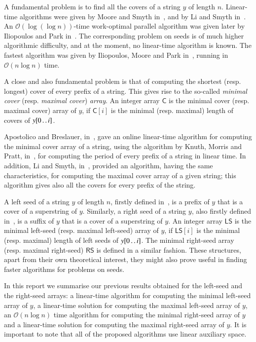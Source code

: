 \documentclass[preprint,12pt]{elsarticle}
\newcommand{\dd}{\mathinner{\ldotp\ldotp}}
\newcommand{\carr}{\textsf{C}}      %
\newcommand{\sarr}{\textsf{LS}}      %
\newcommand{\rsarr}{\textsf{RS}}      %
\newcommand{\cO}{\ensuremath{\mathcal{O}}}
\begin{document}
A fundamental problem is to find all the covers of a string $y$ of length $n$. 
Linear-time algorithms were given by Moore and Smyth in~\cite{moore1994optimal}, 
and by Li and Smyth in~\cite{cover_bill}. An $\cO(\log(\log n))$-time work-optimal parallel 
algorithm was given later by Iliopoulos and Park in~\cite{iliopoulos1996work}. 
The corresponding problem on seeds is of much higher algorithmic difficulty, 
and at the moment, no linear-time algorithm is known.
The fastest algorithm was given by Iliopoulos, Moore and Park in~\cite{Iliopoulos96}, running in $\cO(n\log n)$ time.

A close and also fundamental problem is that of computing the shortest (resp. longest) cover of every prefix of a string. 
This gives rise to the so-called {\em minimal cover} (resp. {\em maximal cover}) {\em array}.
An integer array $\carr$ is the minimal cover (resp. maximal cover) array of $y$, if $\carr[i]$
is the minimal (resp. maximal) length of covers of $y[0\dd i]$.

Apostolico and Breslauer, in~\cite{DBLP:conf/birthday/ApostolicoB97,DBLP:journals/ipl/Breslauer92},
gave an online linear-time algorithm for computing the minimal cover array of a string, using the algorithm by Knuth, Morris and Pratt, 
in~\cite{KMP}, for computing the period of every prefix of a string in linear time.
In addition, Li and Smyth, in~\cite{cover_bill}, provided an algorithm, having the same characteristics, for computing the 
maximal cover array of a given string; this algorithm gives also all the covers for every prefix of the string. 

A left seed of a string $y$ of length $n$, firstly defined in~\cite{cpm_2011}, is a prefix of $y$ that is a cover of a superstring of $y$. 
Similarly, a right seed of a string $y$, also firstly defined in~\cite{cpm_2011}, is a suffix of $y$ that is a cover of a superstring of $y$. 
An integer array $\sarr$ is the minimal left-seed (resp. maximal left-seed) array of $y$, if $\sarr[i]$
is the minimal (resp. maximal) length of left seeds of $y[0\dd i]$.
The minimal right-seed array (resp. maximal right-seed) $\rsarr$ is defined in a similar fashion.
These structures, apart from their own theoretical interest, they might also prove useful in finding faster algorithms for problems 
on seeds.

In this report we summarise our previous results obtained for the left-seed and the right-seed arrays: 
a linear-time algorithm for computing the minimal left-seed array of $y$\cite{cpm_2011}, a linear-time
solution for computing the maximal left-seed array of $y$\cite{cpm_2011}, an $\cO(n\log n)$ time algorithm for 
computing the minimal right-seed array of $y$\cite{COCOON_2011} and a linear-time solution for computing the maximal right-seed array of $y$\cite{COCOON_2011}. It is important to note that all of the proposed algorithms use linear auxiliary space.
\end{document}
